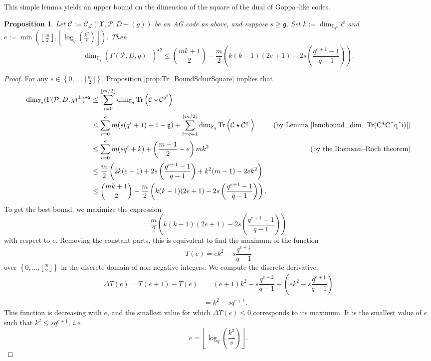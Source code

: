 \documentclass[a4paper]{amsart}
\newtheorem{proposition}[thm]{Proposition}
\theoremstyle{definition}
\theoremstyle{remark}
\newcommand{\calP}{\mathcal{P}}
\newcommand{\calL}{\mathcal{L}}
\newcommand{\calC}{\mathcal{C}}
\newcommand{\calX}{\mathcal{X}}
\newcommand{\fqm}{\mathbb{F}_{q^m}}
\newcommand{\fq}{\mathbb{F}_{q}}
\newcommand{\Tr}[1]{\operatorname{Tr}\left(#1\right)}
\newcommand{\set}[1]{\left\{#1\right\}}
\begin{document}
This simple lemma yields an upper bound on the dimension of the square of the dual of Goppa--like codes.
\begin{proposition} \label{prop:bound_dim_using_inclusions}
    Let $\calC := \calC_{\calL}(\calX,\calP,D+(g))$ be an AG code as above, and suppose $s \geq \mathfrak{g}$. Set $k := \dim_{\fqm}\calC$ and  $e := \min\left(\left\lfloor \frac{m}{2} \right\rfloor,\left\lfloor \log_q\left(\frac{k^2}{s}\right)\right\rfloor\right)$. Then
    $$\dim_{\fq} (\Gamma(\calP,D,g)^{\perp})^{\star 2} \leq \binom{mk+1}{2} - \dfrac{m}{2}\left(k(k-1)(2e+1)-2s\left(\dfrac{q^{e+1}-1}{q-1}\right)\right).$$
\end{proposition}
\begin{proof}
 For any $e \in \set{0,\dots,\lfloor \frac{m}{2} \rfloor}$, Proposition \ref{prop:Tr_BoundSchurSquare} implies that
    \begin{align*}
        \dim_{\fq}(\Gamma(\calP,D,g)^{\perp})^{\star 2}
        & \leq \sum\limits_{i=0}^{\lfloor m/2 \rfloor} \dim_{\fq} \Tr{\calC \star \calC^{q^i}} &\\
        & \leq \sum\limits_{i=0}^{e} m(s(q^i+1)+1-\mathfrak{g})  + \sum\limits_{i=e+1}^{\lfloor m/2 \rfloor} \dim_{\fq} \Tr{\calC \star \calC^{q^i}} & \text{(by Lemma \ref{lem:bound_dim_Tr(C*C^q^i)})}\\
        & \leq \sum\limits_{i=0}^{e} m(sq^i+k) + \left( \frac{m-1}{2} -e \right)mk^2 & \text{(by the Riemann--Roch theorem)}\\
        & \leq \frac{m}{2}\left(2k(e+1)+2s\left(\dfrac{q^{e+1}-1}{q-1}\right)+k^2(m-1)-2ek^2  \right) &\\
        & \leq \binom{mk+1}{2} -  \dfrac{m}{2}\left(k(k-1)(2e+1)-2s\left(\dfrac{q^{e+1}-1}{q-1}\right)\right).&
    \end{align*}
To get the best bound, we maximize the expression $$ \dfrac{m}{2}\left(k(k-1)(2e+1)-2s\left(\dfrac{q^{e+1}-1}{q-1}\right)\right)$$ with respect to $e$. Removing the constant parts, this is equivalent to find the maximum of the function
$$T(e) = ek^2-s\dfrac{q^{e+1}}{q-1}$$
over $\set{0,\dots,\lfloor \frac{m}{2} \rfloor}$ in the discrete domain of non-negative integers.  
We compute the discrete derivative:
\begin{align*}
    \Delta T(e) = T(e+1)-T(e) &= (e+1)k^2-s\dfrac{q^{e+2}}{q-1} - \left(ek^2-s\dfrac{q^{e+1}}{q-1}\right) \\
                              &= k^2 - sq^{e+1}.
\end{align*}
This function is decreasing with $e$, and the smallest value for which $\Delta T(e) \leq 0$ corresponds to its maximum. It is the smallest value of $e$ such that $k^2 \leq sq^{e+1}$, \emph{i.e.}
$$e =  \left\lfloor \log_q\left(\dfrac{k^2}{s}\right)\right\rfloor.$$
\end{proof}
\end{document}

